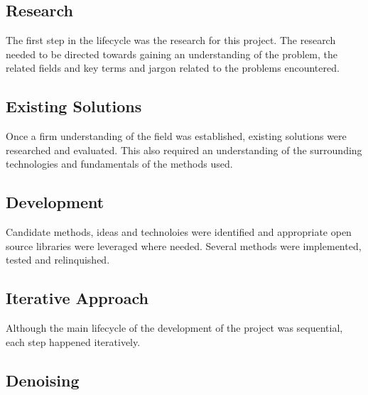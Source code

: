 \documentclass[a4paper, 12pt]{report}
\begin{document}
\subsection{Research}
The first step in the lifecycle was the research for this project. The research needed to be directed towards gaining an understanding of the problem, the related fields and key terms and jargon related to the problems encountered.

\subsection{Existing Solutions}
Once a firm understanding of the field was established, existing solutions were researched and evaluated. This also required an understanding of the surrounding technologies and fundamentals of the methods used.

\subsection{Development}
Candidate methods, ideas and technoloies were identified and appropriate open source libraries were leveraged where needed. Several methods were implemented, tested and relinquished.

\subsection{Iterative Approach}
Although the main lifecycle of the development of the project was sequential, each step happened iteratively.


\subsection{Denoising}
\end{document}
